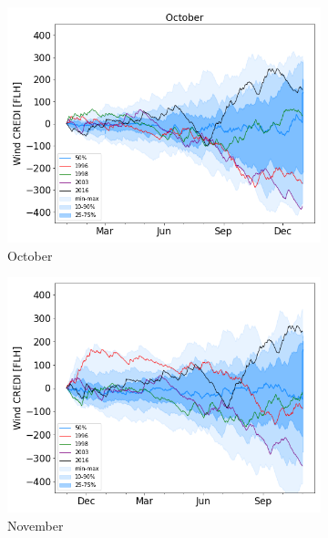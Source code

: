 \documentclass[a4paper,11pt]{extarticle}
\begin{document}
\begin{figure}[b]
\begin{subfigure}[t]{0.32\linewidth}
    \includegraphics[width=\linewidth]{Fig_CUMSUM_YearStart_October}
    \caption{October }
\end{subfigure}
\begin{subfigure}[t]{0.32\linewidth}
    \includegraphics[width=\linewidth]{Fig_CUMSUM_YearStart_November}
    \caption{November}
\end{subfigure}
\begin{subfigure}[t]{0.32\linewidth}

\end{subfigure}
\end{figure}
\end{document}
